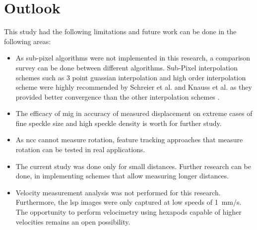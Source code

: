 \chapter{Outlook}\label{chapter:outlook}

This study had the following limitations and future work can be done in the following areas:

\begin{itemize}
    \item As sub-pixel algorithms were not implemented in this research, a comparison survey can be done between different algorithms. Sub-Pixel interpolation schemes such as 3 point guassian interpolation and high order interpolation scheme were highly recommended by Schreier et al. \cite{schreier} and Knauss et al. \cite{knauss} as they provided better convergence than the other interpolation schemes \cite{pan_review}.
    \item The efficacy of \gls{mig} in accuracy of measured displacement on extreme cases of fine speckle size and high speckle density is worth for further study.
    \item As \gls{ncc} cannot measure rotation, feature tracking approaches that measure rotation can be tested  in real applications.
    \item The current study was done only for small distances. Further research can be done, in implementing schemes that allow measuring longer distances. 
    \item Velocity measurement analysis was not performed for this research. Furthermore, the \gls{lsp} images were only captured at low speeds of \SI{1}{\milli\meter/\second}. The opportunity to perform velocimetry using hexapods capable of higher velocities remains an open possibility.  
\end{itemize}
    
  

